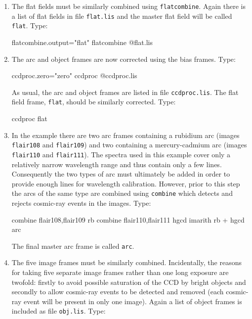 \documentclass[twoside,11pt]{starlink}
\begin{document}
\begin{enumerate}
  \item The flat fields must be similarly combined using \texttt{flatcombine}.  Again there is a list of flat fields in file \texttt{flat.lis} and the master flat field will be called \texttt{flat}.
   Type:

\begin{terminalv}
flatcombine.output="flat"
flatcombine  @flat.lis
\end{terminalv}

  \item The arc and object frames are now corrected using the bias
   frames.  Type:

\begin{terminalv}
ccdproc.zero="zero"
ccdproc  @ccdproc.lis
\end{terminalv}

   As usual, the arc and object frames are listed in file \texttt{ccdproc.lis}.  The flat field frame, \texttt{flat}, should be similarly
   corrected.  Type:

\begin{terminalv}
ccdproc  flat
\end{terminalv}

  \item In the example there are two arc frames containing a
   rubidium arc (images \texttt{flair108} and \texttt{flair109})
   and two containing a mercury-cadmium arc (images
   \texttt{flair110} and \texttt{flair111}).  The spectra used in this example
   cover only a relatively narrow wavelength range and thus contain
   only a few lines.  Consequently the two types of arc must
   ultimately be added in order to provide enough lines for
   wavelength calibration.  However, prior to this step the
   arcs of the same type are combined using \texttt{combine}
   which detects and rejects cosmic-ray events in the images.
   Type:

\begin{terminalv}
combine  flair108,flair109  rb
combine  flair110,flair111  hgcd
imarith  rb + hgcd  arc
\end{terminalv}

   The final master arc frame is called \texttt{arc}.

  \item The five image frames must be similarly combined.  Incidentally, the
   reasons for taking five separate image frames rather than one long
   exposure are twofold: firstly to avoid possible saturation of the CCD by
   bright objects and secondly to allow cosmic-ray events to be detected and
   removed (each cosmic-ray event will be present in only one image).  Again
   a list of object frames is included as file \texttt{obj.lis}.  Type:


\end{enumerate}
\end{document}
